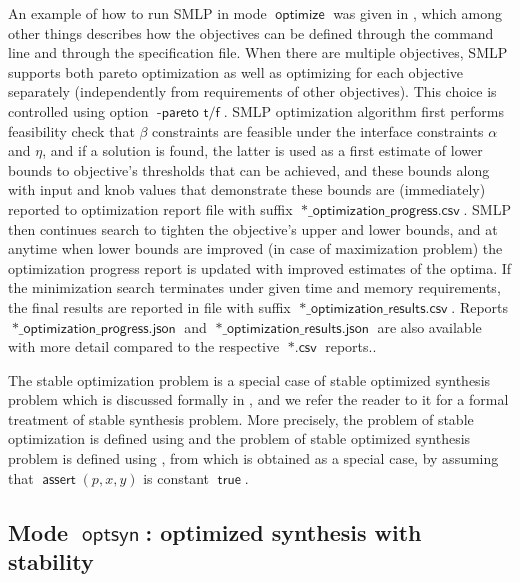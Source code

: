 \documentclass[a4paper,parskip=half]{article} %
\newcommand*\assert{\operatorname{\mathsf{assert}}}
\newcommand*\optionval[2]{\operatorname{\mathsf{#1}\,\,\mathsf{#2}}} %
\newcommand*\suffix[1]{\operatorname{\mathsf{#1}}} %
\newcommand*\mode[1]{\operatorname{\mathsf{#1}}} %
\newcommand*\operator[1]{\operatorname{\mathsf{{#1}}}} %
\begin{document}
An example of how to run SMLP in mode $\mode{optimize}$ was given in , which among other
things describes how the objectives can be defined through the command line and through the specification file.
When there are multiple objectives, SMLP supports both pareto optimization as well as optimizing for each objective
separately (independently from requirements of other objectives). This choice is controlled using option 
$\optionval{-pareto}{t/f}$. SMLP optimization algorithm first performs feasibility check that $\beta$ constraints are 
feasible under the interface constraints $\alpha$ and $\eta$, and if a solution is found, the latter is used as a first
estimate of lower bounds to objective's thresholds that can be achieved, and these bounds along with input and knob
values that demonstrate these bounds are (immediately) reported to optimization report file  with suffix
$\suffix{*\_optimization\_progress.csv}$.  SMLP then continues search to tighten the objective's upper and lower bounds,
and at anytime when lower bounds are improved (in case of maximization problem) the optimization progress report
is updated with improved estimates of the optima. If the minimization search terminates under given time and memory
requirements, the final results are reported in file with suffix  $\suffix{*\_optimization\_results.csv}$. Reports
$\suffix{*\_optimization\_progress.json}$ and  $\suffix{*\_optimization\_results.json}$ are also available with 
more detail compared to the respective $\suffix{*.csv}$ reports.. 

The stable optimization problem is a special case of stable optimized synthesis problem which is discussed formally
in , and we refer the reader to it  for a formal treatment of stable synthesis problem. 
More precisely, the problem of stable optimization is defined using  and the 
problem of stable optimized synthesis problem is defined using , from which 
is obtained as a special case, by assuming that $\assert(p,x,y)$ is constant $\operator{true}$.


\subsection{Mode $\mode{optsyn}$: optimized synthesis with stability}\label{sec:stable:opt:synthesis}
\end{document}
